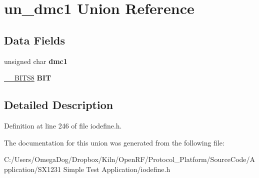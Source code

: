 \hypertarget{unionun__dmc1}{\section{un\-\_\-dmc1 Union Reference}
\label{unionun__dmc1}
}
\subsection*{Data Fields}
\begin{DoxyCompactItemize}
\item 
\hypertarget{unionun__dmc1_a36c83fbc9b89ae24f6419d4d5041548b}{unsigned char {\bfseries dmc1}}\label{unionun__dmc1_a36c83fbc9b89ae24f6419d4d5041548b}

\item 
\hypertarget{unionun__dmc1_af7ab94fd3d02068a9f25bc12d931fedc}{\hyperlink{struct_____b_i_t_s8}{\-\_\-\-\_\-\-B\-I\-T\-S8} {\bfseries B\-I\-T}}\label{unionun__dmc1_af7ab94fd3d02068a9f25bc12d931fedc}

\end{DoxyCompactItemize}


\subsection{Detailed Description}


Definition at line 246 of file iodefine.\-h.



The documentation for this union was generated from the following file\-:\begin{DoxyCompactItemize}
\item 
C\-:/\-Users/\-Omega\-Dog/\-Dropbox/\-Kiln/\-Open\-R\-F/\-Protocol\-\_\-\-Platform/\-Source\-Code/\-Application/\-S\-X1231 Simple Test Application/iodefine.\-h\end{DoxyCompactItemize}
